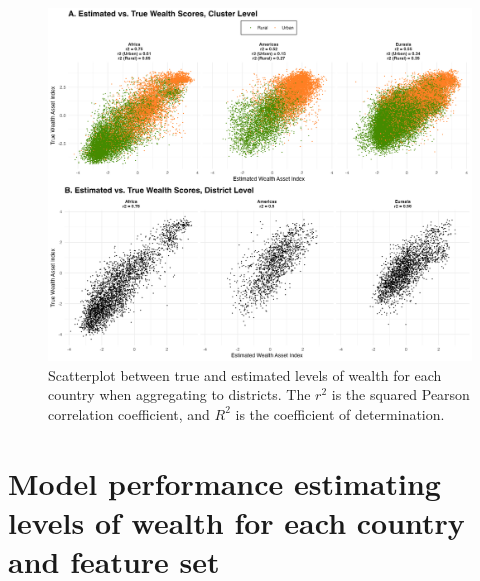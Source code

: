 \documentclass{article}
\begin{document}
\begin{figure}[H]
    \centering
    \includegraphics[width=1\textwidth]{figures/r2_scatter_pooled_by_continent.png}
    \caption{Scatterplot between true and estimated levels of wealth for each country when aggregating to districts. The $r^2$ is the squared Pearson correlation coefficient, and $R^2$ is the coefficient of determination.}
     \label{fig:r2_scatter_pooled_by_continent}
\end{figure}

\newpage
\section{Model performance estimating levels of wealth for each country and feature set}
\label{si:model_perf_fs}
\end{document}
